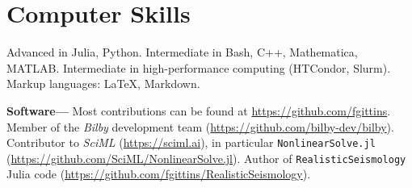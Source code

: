 \section{Computer Skills}

Advanced in Julia, Python.
Intermediate in Bash, C++, Mathematica, MATLAB.
Intermediate in high-performance computing (HTCondor, Slurm).
Markup languages: \LaTeX, Markdown.

\textbf{Software---}%
Most contributions can be found at \url{https://github.com/fgittins}.
Member of the \textit{Bilby} development team
(\url{https://github.com/bilby-dev/bilby}).
Contributor to \textit{SciML} (\url{https://sciml.ai}),
in particular \texttt{NonlinearSolve.jl}
(\url{https://github.com/SciML/NonlinearSolve.jl}).
Author of \texttt{RealisticSeismology} Julia code
(\url{https://github.com/fgittins/RealisticSeismology}).
